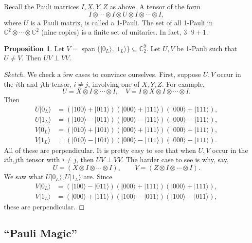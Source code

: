 \documentclass[12pt]{article}
\theoremstyle{definition}
\newtheorem*{proposition}{Proposition}
\newcommand{\C}{\mathbb{C}}
\begin{document}
Recall the Pauli matrices $I,X,Y,Z$ as above. A tensor of the form
\[
I \otimes \cdots \otimes I \otimes U \otimes I \otimes \cdots \otimes I,
\]
where $U$ is a Pauli matrix, is called a 1-Pauli. The set of all 1-Pauli in $\C^2 \otimes \cdots \otimes \C^2$ (nine copies) is a finite set of unitaries. In fact, $3\cdot 9+1$.

\begin{proposition}
Let $V=\operatorname{span}\{|0_L\rangle,|1_L\rangle\} \subseteq \C_2^9$. Let $U,V$ be 1-Pauli such that $U \neq V$. Then $UV \perp VV$.
\end{proposition}

\begin{proof}[Sketch]
We check a few cases to convince ourselves. First, suppose $U,V$ occur in the $i$th and $j$th tensor, $i \neq j$, involving one of $X,Y,Z$. For example,
\[
U=X \otimes I \otimes \cdots \otimes I, \quad V=I \otimes X \otimes I \otimes \cdots \otimes I.
\]
Then
\begin{align*}
U|0_L\rangle &= (|100\rangle+|011\rangle)(|000\rangle+|111\rangle)(|000\rangle+|111\rangle), \\
U|1_L\rangle &= (|100\rangle-|011\rangle)(|000\rangle-|111\rangle)(|000\rangle-|111\rangle), \\
V|0_L\rangle &= (|010\rangle+|101\rangle)(|000\rangle+|111\rangle)(|000\rangle+|111\rangle), \\
V|1_L\rangle &= (|010\rangle-|101\rangle)(|000\rangle-|111\rangle)(|000\rangle-|111\rangle).
\end{align*}
All of these are perpendicular. It is pretty easy to see that when $U,V$ occur in the $i$th,$j$th tensor with $i \neq j$, then $UV \perp VV$. The harder case to see is why, say,
\[
U=(X \otimes I \otimes \cdots \otimes I), \qquad V=(Z \otimes I \otimes \cdots \otimes I).
\]
We saw what $U|0_L\rangle,U|1_L\rangle$ are. Since
\begin{align*}
V|0_L\rangle &= (|100\rangle-|011\rangle)(|000\rangle+|111\rangle)(|000\rangle+|111\rangle), \\
V|1_L\rangle &= (|000\rangle+|111\rangle)(|100\rangle-|011\rangle)(|100\rangle-|011\rangle),
\end{align*}
these are perpendicular.
\end{proof}

\subsection{``Pauli Magic''}
\end{document}
